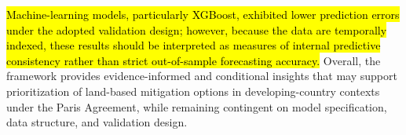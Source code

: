 \documentclass[10pt,letterpaper]{article}
\begin{document}
\hl{Machine-learning models, particularly XGBoost, exhibited lower prediction errors under the adopted validation design; however, because the data are temporally indexed, these results should be interpreted as measures of internal predictive consistency rather than strict out-of-sample forecasting accuracy.} Overall, the framework provides evidence-informed and conditional insights that may support prioritization of land-based mitigation options in developing-country contexts under the Paris Agreement, while remaining contingent on model specification, data structure, and validation design.









%
%
\end{document}
